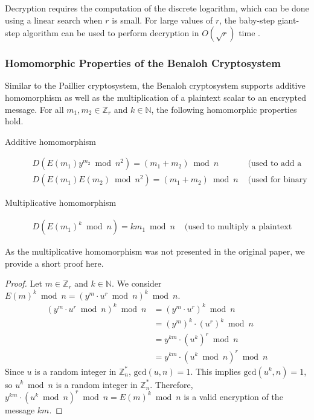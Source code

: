 Decryption requires the computation of the discrete logarithm, which can be done using a linear search when $r$ is small. For large values of $r$, the baby-step giant-step algorithm can be used to perform decryption in $O(\sqrt{r})$ time \cite{benaloh_dense_1994}.

\subsubsection{Homomorphic Properties of the Benaloh Cryptosystem}
Similar to the Paillier cryptosystem, the Benaloh cryptosystem supports additive homomorphism as well as the multiplication of a plaintext scalar to an encrypted message.
For all $m_1,m_2 \in \mathbb{Z}_r$ and $k\in \mathbb{N}$, the following homomorphic properties hold.
\begin{description}
  \item[Additive homomorphism]
  \begin{align*}
    D(E(m_1)y^{m_2}\bmod n^2)=(m_1+m_2)\bmod n & \text{ (used to add a constant)}\\
    D(E(m_1)E(m_2)\bmod n^2)=(m_1+m_2)\bmod n & \text{ (used for binary addition)}
  \end{align*}
  \item[Multiplicative homomorphism]
  \begin{align*}
    D(E(m_1)^k\bmod n)= km_1\bmod n & \text{ (used to multiply a plaintext constant)}
  \end{align*}
\end{description}

As the multiplicative homomorphism was not presented in the original paper, we provide a short proof here.
\begin{proof}
  Let $m \in \mathbb{Z}_r$ and $k\in \mathbb{N}$.
  We consider $E(m)^k\bmod n = (y^m \cdot u^r \bmod{n})^k\bmod n$.
  \begin{align*}
    (y^m \cdot u^r \bmod{n})^k\bmod n
    &= (y^m \cdot u^r)^k \bmod{n}\\
    &= (y^m)^k \cdot (u^r)^k \bmod{n}\\
    &= y^{km} \cdot (u^k)^r \bmod{n}\\
    &= y^{km} \cdot (u^k \bmod{n})^r \bmod{n}
  \end{align*}
  Since $u$ is a random integer in $\mathbb{Z}_n^*$, $\mathrm{gcd}(u,n)=1$.
  This implies $\mathrm{gcd}(u^k,n)=1$, so $u^k \bmod n$ is a random integer in $\mathbb{Z}_n^*$.
  Therefore, $y^{km} \cdot (u^k \bmod{n})^r \bmod{n} = E(m)^k\bmod n$ is a valid encryption of the message $km$.
\end{proof}

